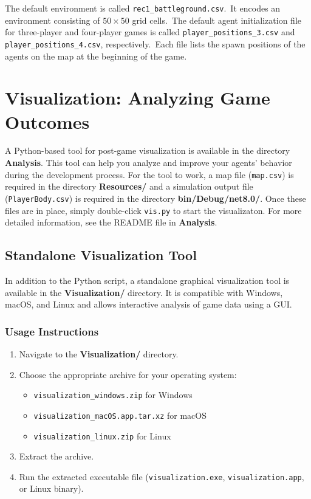 \documentclass[a4paper,english,DIV=16,11pt,parskip=half,dvipsnames,listof=totoc,index=totoc,bibliography=totoc]{scrartcl}
\begin{document}
%
The default environment is called \texttt{rec1\_battleground.csv}.~It encodes an environment consisting of $50\times 50$ grid cells.~The default agent initialization file for three-player and four-player games is called \texttt{player\_positions\_3.csv} and \texttt{player\_positions\_4.csv}, respectively.~Each file lists the spawn positions of the agents on the map at the beginning of the game.
%
\section{Visualization: Analyzing Game Outcomes} \label{sec:vis}

A Python-based tool for post-game visualization is available in the directory \textbf{Analysis}. This tool can help you analyze and improve your agents' behavior during the development process. For the tool to work, a map file (\texttt{map.csv}) is required in the directory \textbf{Resources/} and a simulation output file (\texttt{PlayerBody.csv}) is required in the directory \textbf{bin/Debug/net8.0/}. Once these files are in place, simply double-click \texttt{vis.py} to start the visualizaton. For more detailed information, see the README file in \textbf{Analysis}.

\subsection{Standalone Visualization Tool}
In addition to the Python script, a standalone graphical visualization tool is available in the \textbf{Visualization/} directory. It is compatible with Windows, macOS, and Linux and allows interactive analysis of game data using a GUI.

\subsubsection*{Usage Instructions}
\begin{enumerate}
  \item Navigate to the \textbf{Visualization/} directory.
  \item Choose the appropriate archive for your operating system:
  \begin{itemize}
    \item \texttt{visualization\_windows.zip} for Windows
    \item \texttt{visualization\_macOS.app.tar.xz} for macOS
    \item \texttt{visualization\_linux.zip} for Linux
  \end{itemize}
  \item Extract the archive.
  \item Run the extracted executable file (\texttt{visualization.exe}, \texttt{visualization.app}, or Linux binary).
\end{enumerate}
\end{document}
